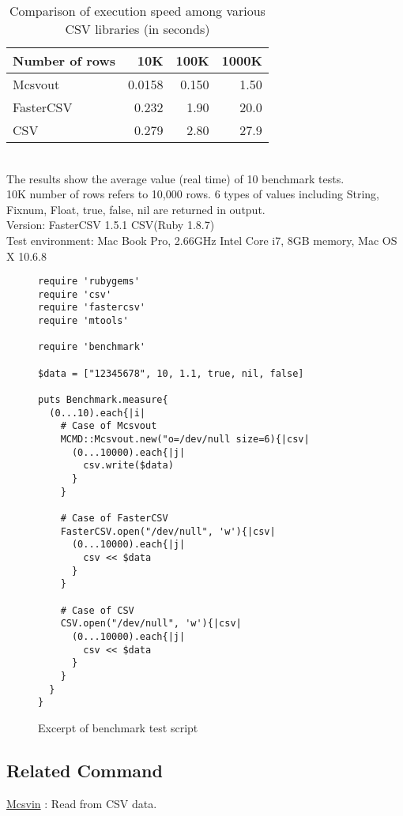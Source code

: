 \begin{table}[htpb]
\begin{center}
\caption{Comparison of execution speed among various CSV libraries (in seconds) \label{tb:mcsvoutRB_bench1}}
\begin{tabular}{l|r|r|r}
\hline
Number of rows      & 10K    & 100K  & 1000K \\ \hline
Mcsvout   & 0.0158 & 0.150 & 1.50  \\
FasterCSV & 0.232  & 1.90  & 20.0  \\
CSV       & 0.279  & 2.80  & 27.9  \\
\hline
\end{tabular}  
{\small
\\The results show the average value (real time) of 10 benchmark tests. \\
10K number of rows refers to 10,000 rows. 6 types of values including String, Fixnum, Float, true, false, nil are returned in output. \\
Version: FasterCSV 1.5.1 CSV(Ruby 1.8.7) \\
Test environment: Mac Book Pro, 2.66GHz Intel Core i7, 8GB memory, Mac OS X 10.6.8
}
\end{center}
\end{table}  

\begin{figure}[htpb]
{\small
\begin{Verbatim}[baselinestretch=0.7,frame=single]
require 'rubygems'
require 'csv'
require 'fastercsv'
require 'mtools'

require 'benchmark'

$data = ["12345678", 10, 1.1, true, nil, false]

puts Benchmark.measure{
  (0...10).each{|i|
    # Case of Mcsvout
    MCMD::Mcsvout.new("o=/dev/null size=6){|csv|
      (0...10000).each{|j|
        csv.write($data)
      }
    }

    # Case of FasterCSV
    FasterCSV.open("/dev/null", 'w'){|csv|
      (0...10000).each{|j|
        csv << $data
      }
    }

    # Case of CSV
    CSV.open("/dev/null", 'w'){|csv|
      (0...10000).each{|j|
        csv << $data
      }
    }
  }
}
\end{Verbatim}
}
\caption{Excerpt of benchmark test script \label{fig:mcsvoutRB_script}}
\end{figure}


\subsection{Related Command}

\hyperref[sect:mcsvinRB]{Mcsvin} : Read from CSV data.

